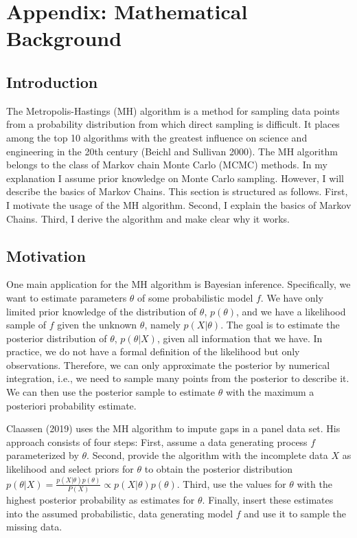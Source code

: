 \documentclass[12pt,english,a4paper,oneside]{article}
\theoremstyle{definition}
\theoremstyle{definition}
\theoremstyle{definition}
\theoremstyle{definition}
\theoremstyle{remark}
\begin{document}
\hypertarget{appendix-mathematical-background}{%
\section{Appendix: Mathematical Background}\label{appendix-mathematical-background}}

\hypertarget{introduction-1}{%
\subsection{Introduction}\label{introduction-1}}

The Metropolis-Hastings (MH) algorithm is a method for sampling data points from a probability distribution from which direct sampling is difficult. It places among the top 10 algorithms with the greatest influence on science and engineering in the 20th century (Beichl and Sullivan 2000). The MH algorithm belongs to the class of Markov chain Monte Carlo (MCMC) methods. In my explanation I assume prior knowledge on Monte Carlo sampling. However, I will describe the basics of Markov Chains. This section is structured as follows. First, I motivate the usage of the MH algorithm. Second, I explain the basics of Markov Chains. Third, I derive the algorithm and make clear why it works.

\hypertarget{motivation}{%
\subsection{Motivation}\label{motivation}}

One main application for the MH algorithm is Bayesian inference. Specifically, we want to estimate parameters \(\theta\) of some probabilistic model \(f\). We have only limited prior knowledge of the distribution of \(\theta\), \(p(\theta)\), and we have a likelihood sample of \(f\) given the unknown \(\theta\), namely \(p(X|\theta)\). The goal is to estimate the posterior distribution of \(\theta\), \(p(\theta|X)\), given all information that we have. In practice, we do not have a formal definition of the likelihood but only observations. Therefore, we can only approximate the posterior by numerical integration, i.e., we need to sample many points from the posterior to describe it. We can then use the posterior sample to estimate \(\theta\) with the maximum a posteriori probability estimate.\newline

\noindent
Claassen (2019) uses the MH algorithm to impute gaps in a panel data set. His approach consists of four steps: First, assume a data generating process \(f\) parameterized by \(\theta\). Second, provide the algorithm with the incomplete data \(X\) as likelihood and select priors for \(\theta\) to obtain the posterior distribution \(p(\theta|X) = \frac{p(X|\theta)p(\theta)}{P(X)} \propto p(X|\theta)p(\theta)\). Third, use the values for \(\theta\) with the highest posterior probability as estimates for \(\theta\). Finally, insert these estimates into the assumed probabilistic, data generating model \(f\) and use it to sample the missing data.\newline
\end{document}
